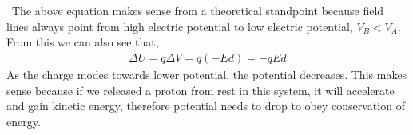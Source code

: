 \documentclass[12pt, titlepage, oneside]{article}
\begin{document}
\noindent{}
\\
\\
\
\noindent The above equation makes sense from a theoretical standpoint because field lines always point from high electric potential to low electric potential, $V_B < V_A$. From this we can also see that,
\begin{align*}
\Delta U = q \Delta V = q (-Ed) = -qEd
\end{align*}
As the charge modes towards lower potential, the potential decreases. This makes sense because if we released a proton from rest in this system, it will accelerate and gain kinetic energy, therefore potential needs to drop to obey conservation of energy.\\

\newpage
\end{document}
